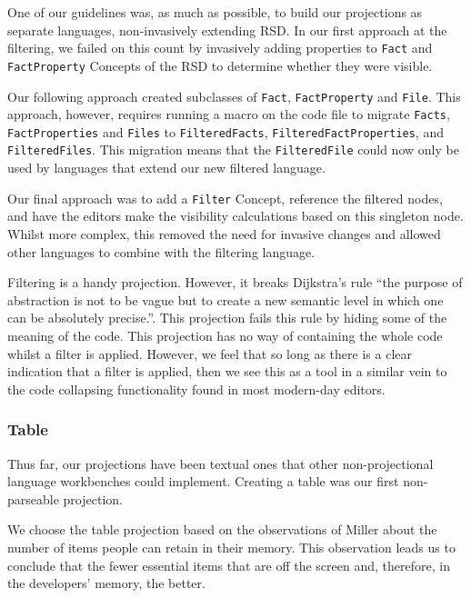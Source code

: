 One of our guidelines was, as much as possible, to build our projections as separate languages, non-invasively extending RSD.
In our first approach at the filtering, we failed on this count by invasively adding properties to \texttt{Fact} and \texttt{FactProperty} Concepts of the RSD to determine whether they were visible.

Our following approach created subclasses of \texttt{Fact}, \texttt{FactProperty} and \texttt{File}.
This approach, however, requires running a macro on the code file to migrate \texttt{Facts}, \texttt{FactProperties} and \texttt{Files} to \texttt{FilteredFacts}, \texttt{FilteredFactProperties}, and \texttt{FilteredFiles}.
This migration means that the \texttt{FilteredFile} could now only be used by languages that extend our new filtered language.

Our final approach was to add a \texttt{Filter} Concept, reference the filtered nodes, and have the editors make the visibility calculations based on this singleton node.
Whilst more complex, this removed the need for invasive changes and allowed other languages to combine with the filtering language.

Filtering is a handy projection.
However, it breaks Dijkstra's rule ``the purpose of abstraction is not to be vague but to create a new semantic level in which one can be absolutely precise.''\cite{dijkstra1972humble}.
This projection fails this rule by hiding some of the meaning of the code.
This projection has no way of containing the whole code whilst a filter is applied.
However, we feel that so long as there is a clear indication that a filter is applied, then we see this as a tool in a similar vein to the code collapsing functionality found in most modern-day editors.

\newpage

\subsubsection{Table}
Thus far, our projections have been textual ones that other non-projectional language workbenches could implement.
Creating a table was our first non-parseable projection.

We choose the table projection based on the observations of Miller\cite{miller1956magical} about the number of items people can retain in their memory.
This observation leads us to conclude that the fewer essential items that are off the screen and, therefore, in the developers' memory, the better.


